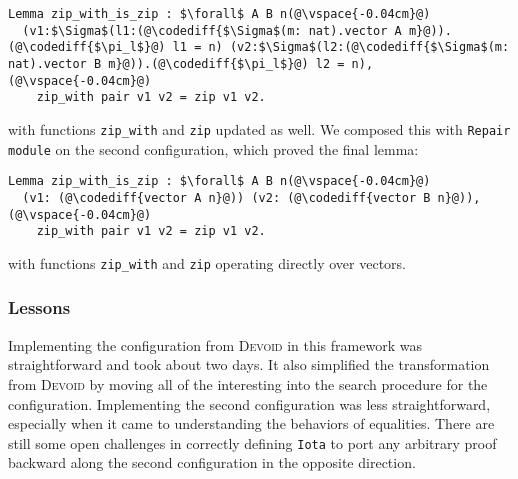 \begin{lstlisting}[backgroundcolor=\color{cyan!30}]
Lemma zip_with_is_zip : $\forall$ A B n(@\vspace{-0.04cm}@)
  (v1:$\Sigma$(l1:(@\codediff{$\Sigma$(m: nat).vector A m}@)).(@\codediff{$\pi_l$}@) l1 = n) (v2:$\Sigma$(l2:(@\codediff{$\Sigma$(m: nat).vector B m}@)).(@\codediff{$\pi_l$}@) l2 = n),(@\vspace{-0.04cm}@)
    zip_with pair v1 v2 = zip v1 v2.
\end{lstlisting}
with functions \lstinline{zip_with} and \lstinline{zip} updated as well.
We composed this with \lstinline{Repair module} on the second configuration,
which proved the final lemma:

\begin{lstlisting}[backgroundcolor=\color{cyan!30}]
Lemma zip_with_is_zip : $\forall$ A B n(@\vspace{-0.04cm}@)
  (v1: (@\codediff{vector A n}@)) (v2: (@\codediff{vector B n}@)),(@\vspace{-0.04cm}@)
    zip_with pair v1 v2 = zip v1 v2.
\end{lstlisting}
with functions \lstinline{zip_with} and \lstinline{zip} operating directly over vectors.

\subsubsection{Lessons}

Implementing the configuration from \textsc{Devoid} in this framework was straightforward and
took about two days.
It also simplified the transformation from \textsc{Devoid} %
by moving all of the interesting into the search procedure for the configuration.
Implementing the second configuration was less straightforward,
especially when it came to understanding the behaviors of equalities.
There are still some open challenges in correctly defining \lstinline{Iota} to port any arbitrary
proof backward along the second configuration in the opposite direction.

